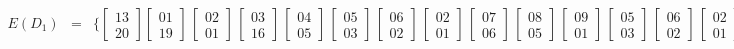 \[\begin{array}{rcl}
E(D_1) &=& \{ \begin{bmatrix} 13 \\ 20 \end{bmatrix} \begin{bmatrix} 01 \\ 19 \end{bmatrix}\,\begin{bmatrix} 02 \\ 01 \end{bmatrix}\,\begin{bmatrix} 03 \\ 16 \end{bmatrix}\,\begin{bmatrix} 04 \\ 05 \end{bmatrix}\,\begin{bmatrix} 05 \\ 03 \end{bmatrix}\,\begin{bmatrix} 06 \\ 02 \end{bmatrix}\,\begin{bmatrix} 02 \\ 01 \end{bmatrix}\,\begin{bmatrix} 07 \\ 06 \end{bmatrix}\,\begin{bmatrix} 08 \\ 05 \end{bmatrix}\,\begin{bmatrix} 09 \\ 01 \end{bmatrix}\,\begin{bmatrix} 05 \\ 03 \end{bmatrix}\,\begin{bmatrix} 06 \\ 02 \end{bmatrix}\,\begin{bmatrix} 02 \\ 01 \end{bmatrix}\,\begin{bmatrix} 10 \\ 03 \end{bmatrix}\,\begin{bmatrix} 11 \\ 02 \end{bmatrix}\,\begin{bmatrix} 12 \\ 01 \end{bmatrix}\,\begin{bmatrix} 09 \\ 01 \end{bmatrix} \} \\[1.8em]

\end{array}\]
